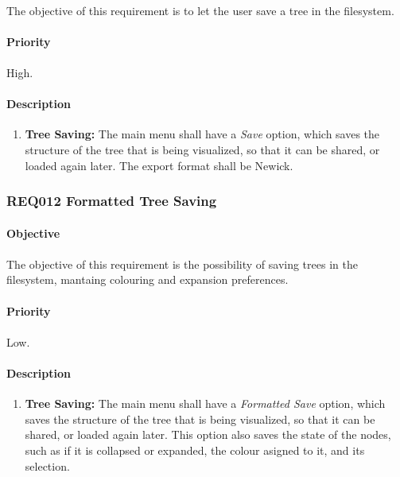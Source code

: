 \documentclass[10pt,a4paper]{article}
\begin{document}
\paragraph{}
The objective of this requirement is to let the user save a tree in the filesystem.
\paragraph{Priority}
\paragraph{}
High.
\paragraph{Description}
  \begin{enumerate}
    \item \textbf{Tree Saving: }
The main menu shall have a \emph{Save} option, which saves the structure of the tree that is being visualized, so that it can be shared, or loaded again later. The export format shall be Newick.
    \end{enumerate}


  \subsubsection{REQ012 Formatted Tree Saving}
\paragraph{Objective}
\paragraph{}
The objective of this requirement is the possibility of saving trees in the filesystem, mantaing colouring and expansion preferences.
\paragraph{Priority}
\paragraph{}
Low.
\paragraph{Description}
  \begin{enumerate}
    \item \textbf{Tree Saving: }
The main menu shall have a \emph{Formatted Save} option, which saves the structure of the tree that is being visualized, so that it can be shared, or loaded again later. This option also saves the state of the nodes, such as if it is collapsed or expanded, the colour asigned to it, and its selection.
    \end{enumerate}
	
\end{document}
